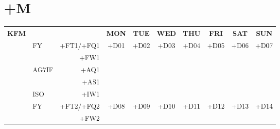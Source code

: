 \chapter*{+M}
\begin{center}
{\ttfamily%
\begin{tabular}{|c|lr|c|c|c|c|c|c|c|}
\hline
    KFM                 &       &           & MON                        & TUE                        & WED                        & THU                        & FRI                        & SAT                        & SUN                        \\ 
\hline
    \multirow{5}{0.5in}{} & FY    & +FT1/+FQ1 & \multirow[t]{5}{1in}{+D01} & \multirow[t]{5}{1in}{+D02} & \multirow[t]{5}{1in}{+D03} & \multirow[t]{5}{1in}{+D04} & \multirow[t]{5}{1in}{+D05} & \multirow[t]{5}{1in}{+D06} & \multirow[t]{5}{1in}{+D07} \\
                        &       &      +FW1 &                            &                            &                            &                            &                            &                            &                            \\
                        & AG7IF &      +AQ1 &                            &                            &                            &                            &                            &                            &                            \\
                        &       &      +AS1 &                            &                            &                            &                            &                            &                            &                            \\
                        & ISO   &      +IW1 &                            &                            &                            &                            &                            &                            &                            \\
\hline
    \multirow{5}{0.5in}{} & FY    & +FT2/+FQ2 & \multirow[t]{5}{1in}{+D08} & \multirow[t]{5}{1in}{+D09} & \multirow[t]{5}{1in}{+D10} & \multirow[t]{5}{1in}{+D11} & \multirow[t]{5}{1in}{+D12} & \multirow[t]{5}{1in}{+D13} & \multirow[t]{5}{1in}{+D14} \\
                        &       &      +FW2 &                            &                            &                            &                            &                            &                            &                            \\

\end{tabular}}
\end{center}
